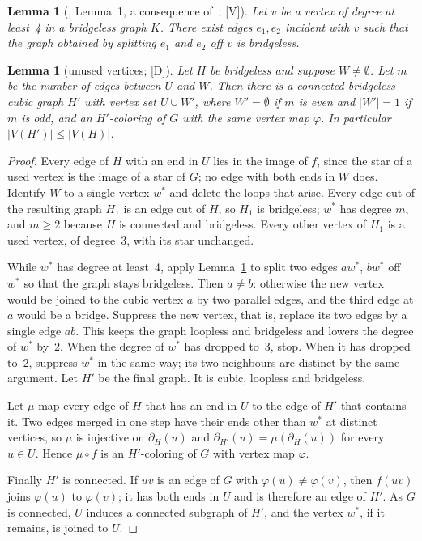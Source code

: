 \documentclass[11pt]{article}
\newtheorem{lemma}[theorem]{Lemma}
\theoremstyle{definition}
\theoremstyle{remark}
\newcommand{\evD}{\textnormal{[D]}}
\newcommand{\evV}{\textnormal{[V]}}
\begin{document}
\begin{lemma}[\cite{KaiserKLW2007}, Lemma~1, a consequence of~\cite{Fleischner1992}; \evV]\label{lem:split}
Let $v$ be a vertex of degree at least~4 in a bridgeless graph $K$. There exist edges $e_1, e_2$
incident with $v$ such that the graph obtained by splitting $e_1$ and $e_2$ off $v$ is bridgeless.
\end{lemma}

\begin{lemma}[unused vertices; \evD]\label{lem:unused}
Let $H$ be bridgeless and suppose $W \ne \emptyset$. Let $m$ be the number of edges between $U$
and $W$. Then there is a connected bridgeless cubic graph $H'$ with vertex set $U \cup W'$, where
$W' = \emptyset$ if $m$ is even and $|W'| = 1$ if $m$ is odd, and an $H'$-coloring of $G$ with
the same vertex map $\varphi$. In particular $|V(H')| \le |V(H)|$.
\end{lemma}

\begin{proof}
Every edge of $H$ with an end in $U$ lies in the image of $f$, since the star of a used vertex is
the image of a star of $G$; no edge with both ends in $W$ does. Identify $W$ to a single vertex
$w^*$ and delete the loops that arise. Every edge cut of the resulting graph $H_1$ is an edge cut
of $H$, so $H_1$ is bridgeless; $w^*$ has degree $m$, and $m \ge 2$ because $H$ is connected and
bridgeless. Every other vertex of $H_1$ is a used vertex, of degree~3, with its star unchanged.

While $w^*$ has degree at least~4, apply Lemma~\ref{lem:split} to split two edges $aw^*$, $bw^*$
off $w^*$ so that the graph stays bridgeless. Then $a \ne b$: otherwise the new vertex would be
joined to the cubic vertex $a$ by two parallel edges, and the third edge at $a$ would be a bridge.
Suppress the new vertex, that is, replace its two edges by a single edge $ab$. This keeps the graph
loopless and bridgeless and lowers the degree of $w^*$ by~2. When the degree of $w^*$ has dropped
to~3, stop. When it has dropped to~2, suppress $w^*$ in the same way; its two neighbours are
distinct by the same argument. Let $H'$ be the final graph. It is cubic, loopless and bridgeless.

Let $\mu$ map every edge of $H$ that has an end in $U$ to the edge of $H'$ that contains it. Two
edges merged in one step have their ends other than $w^*$ at distinct vertices, so $\mu$ is
injective on $\partial_H(u)$ and $\partial_{H'}(u) = \mu(\partial_H(u))$ for every $u \in U$. Hence
$\mu \circ f$ is an $H'$-coloring of $G$ with vertex map $\varphi$.

Finally $H'$ is connected. If $uv$ is an edge of $G$ with $\varphi(u) \ne \varphi(v)$, then
$f(uv)$ joins $\varphi(u)$ to $\varphi(v)$; it has both ends in $U$ and is therefore an edge of
$H'$. As $G$ is connected, $U$ induces a connected subgraph of $H'$, and the vertex $w^*$, if it
remains, is joined to $U$.
\end{proof}
\end{document}
